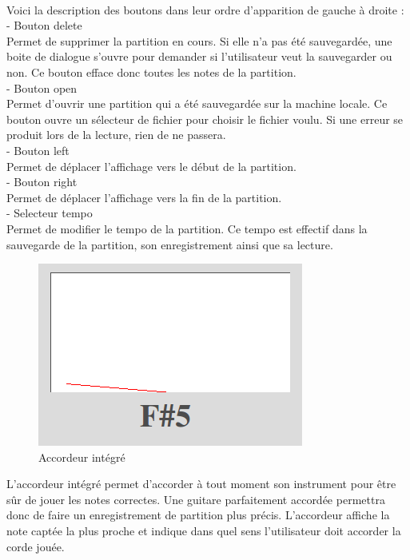 \paragraph{}
Voici la description des boutons dans leur ordre d'apparition de gauche à droite :\\
- Bouton delete\\
Permet de supprimer la partition en cours. Si elle n'a pas été sauvegardée, une boite de dialogue s'ouvre pour demander si l'utilisateur 
veut la sauvegarder ou non. Ce bouton efface donc toutes les notes de la partition.\\
- Bouton open\\
Permet d'ouvrir une partition qui a été sauvegardée sur la machine locale. Ce bouton ouvre un sélecteur de fichier pour choisir le fichier 
voulu. Si une erreur se produit lors de la lecture, rien de ne passera.\\
- Bouton left\\
Permet de déplacer l'affichage vers le début de la partition.\\
- Bouton right\\
Permet de déplacer l'affichage vers la fin de la partition.\\
- Selecteur tempo\\
Permet de modifier le tempo de la partition. Ce tempo est effectif dans la sauvegarde de la partition, son enregistrement ainsi que sa lecture.
\begin{figure}[H]
\centering
\includegraphics[scale=0.5]{Tuner}
\caption{Accordeur intégré}
\end{figure}
L'accordeur intégré permet d'accorder à tout moment son instrument pour être sûr de jouer les notes correctes. Une guitare parfaitement accordée permettra donc 
de faire un enregistrement de partition plus précis. L'accordeur affiche la note captée la plus proche et indique dans quel sens l'utilisateur 
doit accorder la corde jouée.

